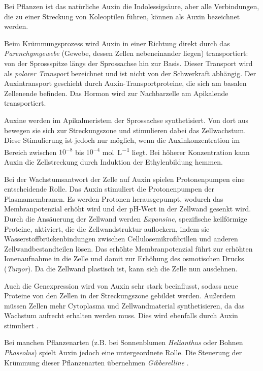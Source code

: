 \documentclass[
11pt, 
ngerman,
listof=totocnumbered,
oneside,
bibliography=totocnumbered,
abstracton
]{scrreprt}
\begin{document}
Bei Pflanzen ist das natürliche Auxin die Indolessigsäure, aber alle Verbindungen, die zu einer Streckung von Koleoptilen führen, können als Auxin bezeichnet werden.

Beim Krümmungsprozess wird Auxin in einer Richtung direkt durch das \emph{Parenchymgewebe} (Gewebe, dessen Zellen nebeneinander liegen) transportiert: von der Sprossspitze längs der Sprossachse hin zur Basis. Dieser Transport wird als \emph{polarer Transport} bezeichnet und ist nicht von der Schwerkraft abhängig. Der Auxintransport geschieht durch Auxin-Transportproteine, die sich am basalen Zellenende befinden. Das Hormon wird zur Nachbarzelle am Apikalende transportiert.

Auxine werden im Apikalmeristem der Sprossachse synthetisiert. Von dort aus bewegen sie sich zur Streckungszone und stimulieren dabei das Zellwachstum. Diese Stimulierung ist jedoch nur möglich, wenn die Auxinkonzentration im Bereich zwischen $10^{-8}$ bis $10^{-4}$ \si{\mole\per\L} liegt. Bei höherer Konzentration kann Auxin die Zellstreckung durch Induktion der Ethylenbildung hemmen.

Bei der Wachstumsantwort der Zelle auf Auxin spielen Protonenpumpen eine entscheidende Rolle. Das Auxin stimuliert die Protonenpumpen der Plasmamembranen. Es werden Protonen herausgepumpt, wodurch das Membranpotenzial erhöht wird und der pH-Wert in der Zellwand gesenkt wird. Durch die Ansäuerung der Zellwand werden \emph{Expansine}, spezifische keilförmige Proteine, aktiviert, die die Zellwandstruktur auflockern, indem sie Wasserstoffbrückenbindungen zwischen Cellulosemikrofibrillen und anderen Zellwandbestandteilen lösen. Das erhöhte Membranpotenzial führt zur erhöhten Ionenaufnahme in die Zelle und damit zur Erhöhung des osmotischen Drucks (\emph{Turgor}). Da die Zellwand plastisch ist, kann sich die Zelle nun ausdehnen. 

Auch die Genexpression wird von Auxin sehr stark beeinflusst, sodass neue Proteine von den Zellen in der Streckungszone gebildet werden. Außerdem müssen Zellen mehr Cytoplasma und Zellwandmaterial synthetisieren, da das Wachstum aufrecht erhalten werden muss. Dies wird ebenfalls durch Auxin stimuliert \parencite[1118--1120]{campbell}.

Bei manchen Pflanzenarten (z.B. bei Sonnenblumen \emph{Helianthus} oder Bohnen \emph{Phaseolus}) spielt Auxin jedoch eine untergeordnete Rolle. Die Steuerung der Krümmung dieser Pflanzenarten übernehmen \emph{Gibberelline} \parencite[502--503]{Nultsch}.
\end{document}
